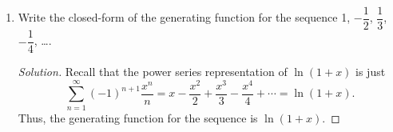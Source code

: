 \documentclass{article}
\newenvironment{solution}
  {\renewcommand\qedsymbol{$\blacksquare$}\begin{proof}[Solution]}
  {\end{proof}}
\begin{document}
\begin{enumerate}
\begin{solution}
\[            \sum_{n=0}^{\infty} \frac{x^n}{n!} = 1 + 1x + \frac{1}{2!} x^2 + \frac{1}{3!} x^3 + \frac{1}{4!} x^4 + \cdots = e^x.     
        \] To get from here to the given, we remove the first term. Thus, the generating function is $e^x -1$. 
    \end{solution}
    \item Write the closed-form of the generating function for the sequence 1, $-\dfrac{1}{2}$, $\dfrac{1}{3}$, $-\dfrac{1}{4}$, \ldots.\begin{solution} 
        Recall that the power series representation of $\ln{(1+x)}$ is just\[
            \sum_{n=1}^{\infty} {(-1)}^{n+1} \frac{x^n}{n} = x - \frac{x^2}{2} + \frac{x^3}{3} - \frac{x^4}{4} + \cdots = \ln{(1+x)}. 
        \] Thus, the generating function for the sequence is $\ln{(1+x)}$. 
    \end{solution}
\end{enumerate}  

\pagebreak
\end{document}
